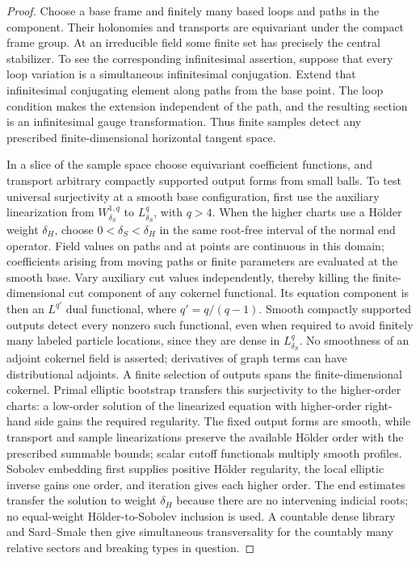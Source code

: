 \begin{proof}
Choose a base frame and finitely many based loops and paths in the
component.  Their holonomies and transports are equivariant under
the compact frame group.  At an irreducible field some finite set
has precisely the central stabilizer.  To see the corresponding
infinitesimal assertion, suppose that every loop variation is a
simultaneous infinitesimal conjugation.  Extend that infinitesimal
conjugating element along paths from the base point.  The loop
condition makes the extension independent of the path, and the
resulting section is an infinitesimal gauge transformation.  Thus
finite samples detect any prescribed finite-dimensional horizontal
tangent space.

In a slice of the sample space choose equivariant coefficient
functions, and transport arbitrary compactly supported output forms
from small balls.  To test universal surjectivity at a smooth base
configuration, first use the auxiliary linearization from
$W^{1,q}_{\delta_S}$ to $L^q_{\delta_S}$, with $q>4$.  When the
higher charts use a H\"older weight $\delta_H$, choose
$0<\delta_S<\delta_H$ in the same root-free interval of the
normal end operator.  Field values on paths
and at points are continuous in this domain; coefficients arising
from moving paths or finite parameters are evaluated at the smooth
base.  Vary auxiliary cut values independently, thereby killing the
finite-dimensional cut component of any cokernel functional.  Its
equation component is then an $L^{q'}$ dual functional, where
$q'=q/(q-1)$.  Smooth compactly supported outputs detect every
nonzero such functional, even when required to avoid finitely many
labeled particle locations, since they are dense in $L^q_{\delta_S}$.
No smoothness of an adjoint cokernel field is asserted; derivatives
of graph terms can have distributional adjoints.  A finite selection
of outputs spans the finite-dimensional cokernel.  Primal elliptic
bootstrap transfers this surjectivity to the higher-order charts:
a low-order solution of the linearized equation with higher-order
right-hand side gains the required regularity.  The fixed output
forms are smooth, while transport and sample linearizations preserve
the available H\"older order with the prescribed summable bounds;
scalar cutoff functionals multiply smooth profiles.  Sobolev
embedding first supplies positive H\"older regularity, the local
elliptic inverse gains one order, and iteration gives each higher
order.  The end estimates transfer the solution to weight
$\delta_H$ because there are no intervening indicial roots;
no equal-weight H\"older-to-Sobolev inclusion is used.
A countable dense library and Sard--Smale then give simultaneous
transversality for the countably many relative sectors and breaking
types in question.


\end{proof}
